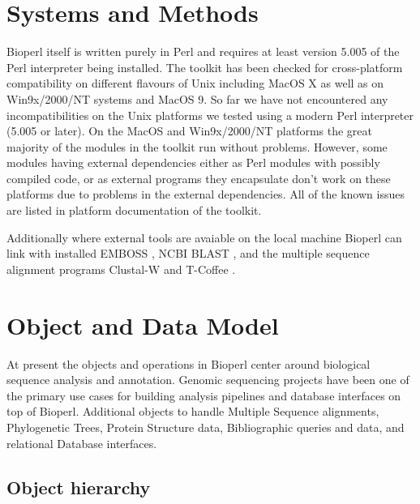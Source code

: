 \documentclass[twocolumn]{article}
\begin{document}
\section{Systems and Methods}

Bioperl itself is written purely in Perl and requires at least version
5.005 of the Perl interpreter being installed.  The toolkit has been
checked for cross-platform compatibility on different flavours of Unix
including MacOS X as well as on Win9x/2000/NT systems and MacOS 9.  So
far we have not encountered any incompatibilities on the Unix
platforms we tested using a modern Perl interpreter (5.005 or later).
On the MacOS and Win9x/2000/NT platforms the great majority of the
modules in the toolkit run without problems.  However, some modules
having external dependencies either as Perl modules with possibly
compiled code, or as external programs they encapsulate don't work on
these platforms due to problems in the external dependencies.  All of
the known issues are listed in platform documentation of the toolkit.

Additionally where external tools are avaiable on the local machine
Bioperl can link with installed EMBOSS \cite{emboss}, NCBI BLAST
\cite{blast}, and the multiple sequence alignment programs Clustal-W
\cite{clustalw} and T-Coffee \cite{tcoffee}.

\section{Object and Data Model}

At present the objects and operations in Bioperl center around
biological sequence analysis and annotation.  Genomic sequencing
projects have been one of the primary use cases for building analysis
pipelines and database interfaces on top of Bioperl.   Additional
objects to handle Multiple Sequence alignments, Phylogenetic Trees,
Protein Structure data, Bibliographic queries and data, and relational
Database interfaces.

\subsection{Object hierarchy}
\end{document}
